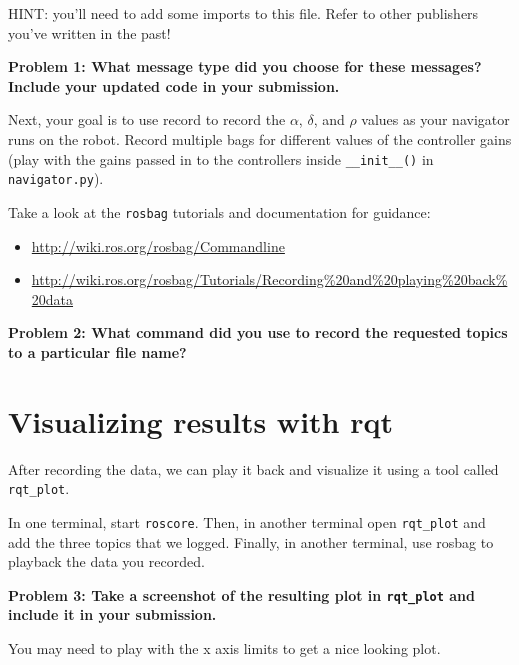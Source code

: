 \documentclass{article}
\begin{document}
HINT: you'll need to add some imports to this file. Refer to other publishers you've written in the past!

\textbf{Problem 1: What message type did you choose for these messages? Include your updated code in your submission.}

Next, your goal is to use record to record the $\alpha$, $\delta$, and $\rho$ values as your navigator runs on the robot. Record multiple bags for different values of the controller gains (play with the gains passed in to the controllers inside \texttt{\_\_init\_\_()} in \texttt{navigator.py}).

Take a look at the 
\texttt{rosbag} tutorials and documentation for guidance:
\begin{itemize}
    \item \url{http://wiki.ros.org/rosbag/Commandline}
    \item \url{http://wiki.ros.org/rosbag/Tutorials/Recording\%20and\%20playing\%20back\%20data}
\end{itemize}


\textbf{Problem 2: What command did you use to record the requested topics to a particular file name?}

\section{Visualizing results with rqt}
After recording the data, we can play it back and visualize it using a tool called \texttt{rqt\_plot}. 

In one terminal, start \texttt{roscore}. Then, in another terminal open \texttt{rqt\_plot} and add the three topics that we logged. Finally, in another terminal, use rosbag to playback the data you recorded. 

\textbf{Problem 3: Take a screenshot of the resulting plot in \texttt{rqt\_plot} and include it in your submission.}

You may need to play with the x axis limits to get a nice looking plot.
\end{document}
